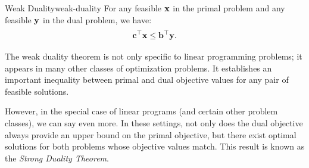\begin{theorem}{Weak Duality}{weak-duality}
For any feasible $\mathbf{x}$ in the primal problem and any feasible $\mathbf{y}$ in the dual problem, we have:
\[
\mathbf{c}^\top \mathbf{x} \leq \mathbf{b}^\top \mathbf{y}.
\]
\end{theorem}

The weak duality theorem is not only specific to linear programming problems; it appears in many other classes of optimization problems. It establishes an important inequality between primal and dual objective values for any pair of feasible solutions.

However, in the special case of linear programs (and certain other problem classes), we can say even more. In these settings, not only does the dual objective always provide an upper bound on the primal objective, but there exist optimal solutions for both problems whose objective values match. This result is known as the \emph{Strong Duality Theorem}.

